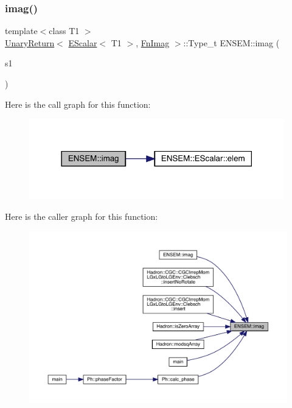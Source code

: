 \subsubsection{\texorpdfstring{imag()}{imag()}}
{\footnotesize\ttfamily template$<$class T1 $>$ \\
\mbox{\hyperlink{structENSEM_1_1UnaryReturn}{Unary\+Return}}$<$ \mbox{\hyperlink{classENSEM_1_1EScalar}{E\+Scalar}}$<$ T1 $>$, \mbox{\hyperlink{structENSEM_1_1FnImag}{Fn\+Imag}} $>$\+::Type\+\_\+t E\+N\+S\+E\+M\+::imag (\begin{DoxyParamCaption}\item[{const \mbox{\hyperlink{classENSEM_1_1EScalar}{E\+Scalar}}$<$ T1 $>$ \&}]{s1 }\end{DoxyParamCaption})\hspace{0.3cm}{\ttfamily [inline]}}

Here is the call graph for this function\+:
\nopagebreak
\begin{figure}[H]
\begin{center}
\leavevmode
\includegraphics[width=314pt]{d4/dca/group__escalar_ga415448f22c6dabfd82cbb0154e054c2e_cgraph}
\end{center}
\end{figure}
Here is the caller graph for this function\+:
\nopagebreak
\begin{figure}[H]
\begin{center}
\leavevmode
\includegraphics[width=350pt]{d4/dca/group__escalar_ga415448f22c6dabfd82cbb0154e054c2e_icgraph}
\end{center}
\end{figure}
\mbox{\label{group__escalar_ga70fcd41007f852c6b90539df7b80af87}} 
